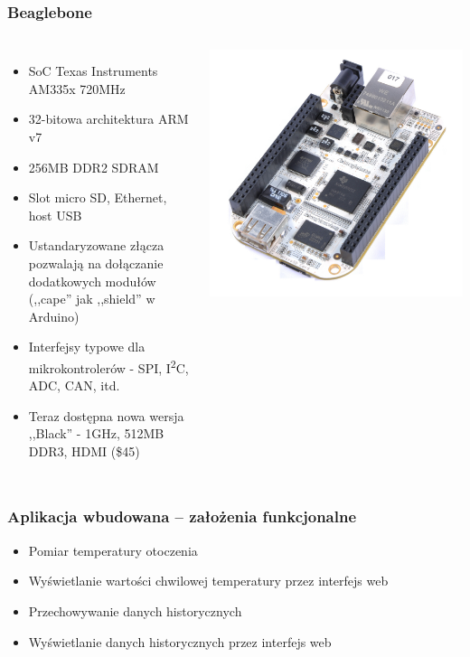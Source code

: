 \documentclass[dvipsnames,table]{beamer}
\begin{document}
\begin{frame}
\frametitle{Beaglebone}

\begin{columns}[c]
\column{3in}

\begin{itemize}

	\item SoC Texas Instruments AM335x 720MHz
	\item 32-bitowa architektura ARM v7
	\item 256MB DDR2 SDRAM
	\item Slot micro SD, Ethernet, host USB
	\item Ustandaryzowane złącza pozwalają na dołączanie dodatkowych modułów (,,cape'' jak ,,shield'' w Arduino)
	\item Interfejsy typowe dla mikrokontrolerów - SPI, I\textsuperscript{2}C, ADC, CAN, itd.
	\item Teraz dostępna nowa wersja ,,Black'' - 1GHz, 512MB DDR3, HDMI (\$45)
\end{itemize}

\column{1.5in}
	\includegraphics[scale=0.5]{img_beaglebone.jpg}
\end{columns}
\end{frame}

\begin{frame}
\frametitle{Aplikacja wbudowana -- założenia funkcjonalne}
\begin{itemize}
	\item Pomiar temperatury otoczenia
	\item Wyświetlanie wartości chwilowej temperatury przez interfejs web
	\item Przechowywanie danych historycznych
	\item Wyświetlanie danych historycznych przez interfejs web
\end{itemize}
\end{frame}
\end{document}
